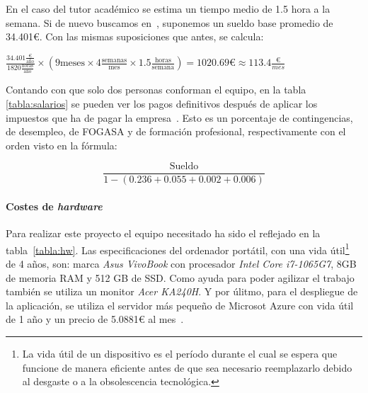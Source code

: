 En el caso del tutor académico se estima un tiempo medio de 1.5 hora a la semana. Si de nuevo buscamos en~\cite{salarioProfe}, suponemos un sueldo base promedio de 34.401€. Con las mismas suposiciones que antes, se calcula:
\begin{center}
	$ \frac{34.401\frac{\text{€}}{\text{año}}}{1820\frac{\text{horas}}{\text{año}}} \times (9\text{meses} \times 4\frac{\text{semanas}}{\text{mes}} \times 1.5\frac{\text{horas}}{\text{semana}}) = 1020.69\text{€} \approx 113.4\frac{\text{€}}{mes}$
\end{center}

Contando con que solo dos personas conforman el equipo, en la tabla \ref{tabla:salarios} se pueden ver los pagos definitivos después de aplicar los impuestos que ha de pagar la empresa~\cite{impuestos}. Esto es un porcentaje de contingencias, de desempleo, de FOGASA y de formación profesional, respectivamente con el orden visto en la fórmula:

\[
\frac{\text{Sueldo}}{1-(0.236+0.055+0.002+0.006)}
\]

\begin{table}[H]
	\caption{Salarios brutos y costes después de impuestos}
	\label{tabla:salarios}
\end{table}

\paragraph{Costes de \textit{hardware}} Para realizar este proyecto el equipo necesitado ha sido el reflejado en la tabla~\ref{tabla:hw}. Las especificaciones del ordenador portátil, con una vida útil\footnote{La vida útil de un dispositivo es el período durante el cual se espera que funcione de manera eficiente antes de que sea necesario reemplazarlo debido al desgaste o a la obsolescencia tecnológica.} de 4 años, son: marca \textit{Asus VivoBook} con procesador \textit{Intel Core i7-1065G7}, 8GB de memoria RAM y 512 GB de SSD. Como ayuda para poder agilizar el trabajo también se utiliza un monitor \textit{Acer KA240H}. Y por úlitmo, para el despliegue de la aplicación, se utiliza el servidor más pequeño de Microsot Azure con vida útil de 1 año y un precio de 5.0881€ al mes~\cite{azure:plans}.

